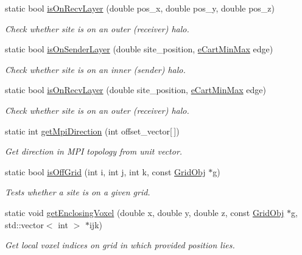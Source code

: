 \begin{DoxyCompactItemize}
static bool \hyperlink{class_grid_utils_abfec29d90b6942de2f3c52c225a4d888}{is\+On\+Recv\+Layer} (double pos\+\_\+x, double pos\+\_\+y, double pos\+\_\+z)
\begin{DoxyCompactList}\small\item\em Check whether site is on an outer (receiver) halo. \end{DoxyCompactList}\item 
static bool \hyperlink{class_grid_utils_a9179e27b25b1be249edd6d22455d57bd}{is\+On\+Sender\+Layer} (double site\+\_\+position, \hyperlink{_grid_utils_8h_a0cc91691e907a6a03b129d18a62fe33d}{e\+Cart\+Min\+Max} edge)
\begin{DoxyCompactList}\small\item\em Check whether site is on an inner (sender) halo. \end{DoxyCompactList}\item 
static bool \hyperlink{class_grid_utils_a381a3ef0d42132313081b5c06f732092}{is\+On\+Recv\+Layer} (double site\+\_\+position, \hyperlink{_grid_utils_8h_a0cc91691e907a6a03b129d18a62fe33d}{e\+Cart\+Min\+Max} edge)
\begin{DoxyCompactList}\small\item\em Check whether site is on an outer (receiver) halo. \end{DoxyCompactList}\item 
static int \hyperlink{class_grid_utils_a1a59da2eb58afd9e785b45b23ad962df}{get\+Mpi\+Direction} (int offset\+\_\+vector\mbox{[}$\,$\mbox{]})
\begin{DoxyCompactList}\small\item\em Get direction in M\+PI topology from unit vector. \end{DoxyCompactList}\item 
static bool \hyperlink{class_grid_utils_acb35c1a485e74c0b2794b84573b5e50f}{is\+Off\+Grid} (int i, int j, int k, const \hyperlink{class_grid_obj}{Grid\+Obj} $\ast$g)
\begin{DoxyCompactList}\small\item\em Tests whether a site is on a given grid. \end{DoxyCompactList}\item 
static void \hyperlink{class_grid_utils_ad0c030776101d001fda37eb7f90d2b20}{get\+Enclosing\+Voxel} (double x, double y, double z, const \hyperlink{class_grid_obj}{Grid\+Obj} $\ast$g, std\+::vector$<$ int $>$ $\ast$ijk)
\begin{DoxyCompactList}\small\item\em Get local voxel indices on grid in which provided position lies. \end{DoxyCompactList}\item 

\end{DoxyCompactItemize}
